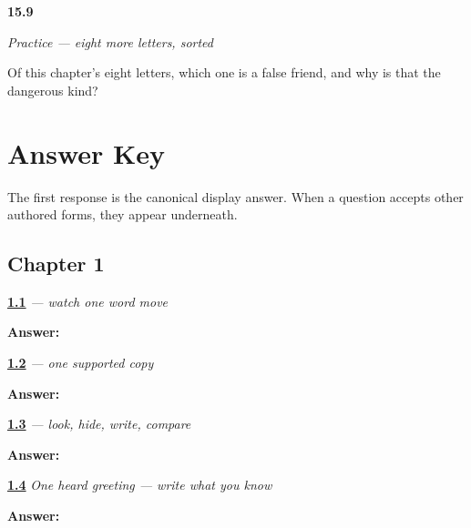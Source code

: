 \noindent\begin{minipage}[t]{\linewidth}
\raggedright
\hypertarget{review-RU-C15-practice-false}{\textbf{15.9}} \emph{Practice — eight more letters, sorted}\par
\small Of this chapter's eight letters, which one is a false friend, and why is that the dangerous kind?
\end{minipage}\par\medskip

\chapter*{Answer Key}

The first response is the canonical display answer. When a question accepts other authored forms, they appear underneath.

\section*{Chapter 1}

\noindent\begin{minipage}[t]{\linewidth}
\raggedright
\hyperlink{review-RU-W05-privet-observe-check}{\textbf{1.1}} \emph{ — watch one word move}\par
\small \textbf{Answer:} \par
\end{minipage}\par\medskip

\noindent\begin{minipage}[t]{\linewidth}
\raggedright
\hyperlink{review-RU-W05-privet-guided-copy-check}{\textbf{1.2}} \emph{ — one supported copy}\par
\small \textbf{Answer:} \par
\end{minipage}\par\medskip

\noindent\begin{minipage}[t]{\linewidth}
\raggedright
\hyperlink{review-RU-W05-privet-delayed-copy-check}{\textbf{1.3}} \emph{ — look, hide, write, compare}\par
\small \textbf{Answer:} \par
\end{minipage}\par\medskip

\noindent\begin{minipage}[t]{\linewidth}
\raggedright
\hyperlink{review-RU-W05-privet-dictation-answer}{\textbf{1.4}} \emph{One heard greeting — write what you know}\par
\small \textbf{Answer:} \par
\end{minipage}\par\medskip

